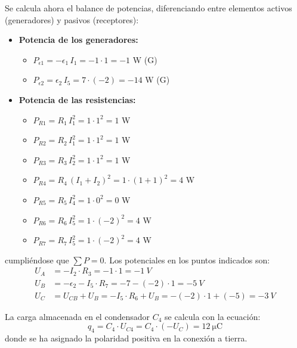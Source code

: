 Se calcula ahora el balance de potencias, diferenciando entre
elementos activos (generadores) y pasivos (receptores):
\begin{itemize}
\item \textbf{Potencia de los generadores:}
  \begin{itemize}
  \item $P_{\epsilon1}=-\epsilon_1\,I_1=-1\cdot 1=-1$ W (G)
  \item $P_{\epsilon2}=\epsilon_2\,I_5=7\cdot (-2)=-14$ W (G)
  \end{itemize}
\item \textbf{Potencia de las resistencias:}
  \begin{itemize}
  \item $P_{R1}=R_1\,I_1^2=1\cdot 1^2=1$ W
  \item $P_{R2}=R_2\,I_1^2=1\cdot 1^2=1$ W
  \item $P_{R3}=R_3\,I_2^2=1\cdot 1^2=1$ W
  \item $P_{R4}=R_4\,(I_1+I_2)^2=1\cdot (1+1)^2=4$ W
  \item $P_{R5}=R_5\,I_4^2=1\cdot 0^2=0$ W
  \item $P_{R6}=R_6\,I_5^2=1\cdot (-2)^2=4$ W
  \item $P_{R7}=R_7\,I_5^2=1\cdot (-2)^2=4$ W
  \end{itemize}
\end{itemize}
cumpliéndose que $\sum P = 0$. Los potenciales en los puntos indicados
son:
\begin{align*}
  U_A &= -I_2 \cdot R_3 = -1\cdot 1= \qty{-1}{V}\\
  U_B &= -\epsilon_2 - I_5 \cdot R_7 =-7-(-2)\cdot 1= \qty{-5}{V}\\
  U_C &= U_{CB} + U_B = -I_5 \cdot R_6 + U_B = -(-2)\cdot 1+(-5)= \qty{-3}{V}
\end{align*}

La carga almacenada en el condensador $C_4$ se calcula con la
ecuación:
\begin{equation*}
  q_4 = C_4 \cdot U_{C4} = C_4 \cdot (-U_C) = \qty{12}{\micro\coulomb}
\end{equation*}
donde se ha asignado la polaridad positiva en la conexión a tierra.

